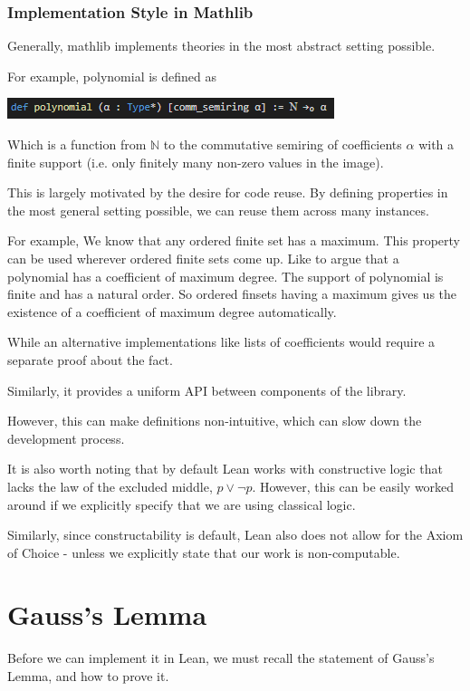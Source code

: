 \documentclass[pagesize=a4]{scrreprt}
\newcommand{\N}{\mathbb{N}}
\begin{document}
\subsubsection{Implementation Style in Mathlib}

Generally, mathlib implements theories in the most abstract setting possible. 

For example, polynomial is defined as

\includegraphics{polynomial.png}

Which is a function from $\N$ to the commutative semiring of coefficients $\alpha$ with a finite support (i.e. only finitely many non-zero values in the image). 

  This is largely motivated by the desire for code reuse. By defining properties in the most general setting possible, we can reuse them across many instances.

 For example, We know that any ordered finite set has a maximum. This property can be used wherever ordered finite sets come up. 
        Like to argue that a polynomial has a coefficient of maximum degree. The support of polynomial is finite and has a natural order. So ordered finsets having a maximum gives us the existence of a coefficient of maximum degree automatically.


 While an alternative implementations like lists of coefficients would require a separate proof about the fact. 


 Similarly, it provides a uniform API between components of the library. 

 However, this can make definitions non-intuitive, which can slow down the development process. 


 It is also worth noting that by default Lean works with constructive logic that lacks the law of the excluded middle, $p \vee \neg p$. However, this can be easily worked around if we explicitly specify that we are using classical logic. 

Similarly, since constructability is default, Lean also does not allow for the Axiom of Choice - unless we explicitly state that our work is non-computable. 


\section{Gauss's Lemma}

Before we can implement it in Lean, we must recall the statement of Gauss's Lemma, and how to prove it. 
\end{document}
